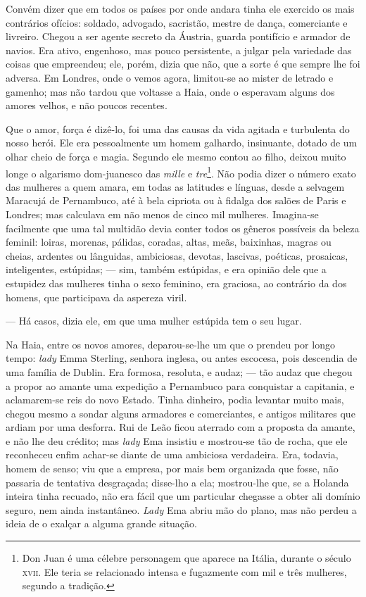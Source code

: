 Convém dizer que em todos os países por onde andara tinha ele exercido
os mais contrários ofícios: soldado, advogado, sacristão, mestre de
dança, comerciante e livreiro. Chegou a ser agente secreto da Áustria,
guarda pontifício e armador de navios. Era ativo, engenhoso, mas pouco
persistente, a julgar pela variedade das coisas que empreendeu; ele,
porém, dizia que não, que a sorte é que sempre lhe foi adversa. Em
Londres, onde o vemos agora, limitou-se ao mister de letrado e gamenho;
mas não tardou que voltasse a Haia, onde o esperavam alguns dos amores
velhos, e não poucos recentes.

Que o amor, força é dizê-lo, foi uma das causas da vida agitada e
turbulenta do nosso herói. Ele era pessoalmente um homem galhardo,
insinuante, dotado de um olhar cheio de força e magia. Segundo ele mesmo
contou ao filho, deixou muito longe o algarismo dom-juanesco das
\emph{mille} e \emph{tre}\footnote{Don Juan é uma célebre personagem que
  aparece na Itália, durante o século \textsc{xvii}. Ele teria se relacionado
  intensa e fugazmente com mil e três mulheres, segundo a tradição.}.
Não podia dizer o número exato das mulheres a quem amara, em todas as
latitudes e línguas, desde a selvagem Maracujá de Pernambuco, até à bela
cipriota ou à fidalga dos salões de Paris e Londres; mas calculava em
não menos de cinco mil mulheres. Imagina-se facilmente que uma tal
multidão devia conter todos os gêneros possíveis da beleza feminil:
loiras, morenas, pálidas, coradas, altas, meãs, baixinhas, magras ou
cheias, ardentes ou lânguidas, ambiciosas, devotas, lascivas, poéticas,
prosaicas, inteligentes, estúpidas; --- sim, também estúpidas, e era
opinião dele que a estupidez das mulheres tinha o sexo feminino, era
graciosa, ao contrário da dos homens, que participava da aspereza viril.

--- Há casos, dizia ele, em que uma mulher estúpida tem o seu lugar.

Na Haia, entre os novos amores, deparou-se-lhe um que o prendeu por
longo tempo: \emph{lady} Emma Sterling, senhora inglesa, ou antes
escocesa, pois descendia de uma família de Dublin. Era formosa,
resoluta, e audaz; --- tão audaz que chegou a propor ao amante uma
expedição a Pernambuco para conquistar a capitania, e aclamarem-se reis
do novo Estado. Tinha dinheiro, podia levantar muito mais, chegou mesmo
a sondar alguns armadores e comerciantes, e antigos militares que ardiam
por uma desforra. Rui de Leão ficou aterrado com a proposta da amante, e
não lhe deu crédito; mas \emph{lady} Ema insistiu e mostrou-se tão de
rocha, que ele reconheceu enfim achar-se diante de uma ambiciosa
verdadeira. Era, todavia, homem de senso; viu que a empresa, por mais
bem organizada que fosse, não passaria de tentativa desgraçada;
disse-lho a ela; mostrou-lhe que, se a Holanda inteira tinha recuado,
não era fácil que um particular chegasse a obter ali domínio seguro, nem
ainda instantâneo. \emph{Lady} Ema abriu mão do plano, mas não perdeu a
ideia de o exalçar a alguma grande situação.

